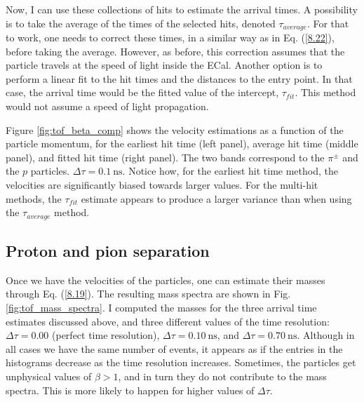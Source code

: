 Now, I can use these collections of hits to estimate the arrival times. A possibility is to take the average of the times of the selected hits, denoted $\tau_{average}$. For that to work, one needs to correct these times, in a similar way as in Eq. (\ref{8.22}), before taking the average. However, as before, this correction assumes that the particle travels at the speed of light inside the ECal. Another option is to perform a linear fit to the hit times and the distances to the entry point. In that case, the arrival time would be the fitted value of the intercept, $\tau_{fit}$. This method would not assume a speed of light propagation.

Figure \ref{fig:tof_beta_comp} shows the velocity estimations as a function of the particle momentum, for the earliest hit time (left panel), average hit time (middle panel), and fitted hit time (right panel). The two bands correspond to the $\pi^{\pm}$ and the $p$ particles. $\Delta \tau = 0.1 ~ \mathrm{ns}$. Notice how, for the earliest hit time method, the velocities are significantly biased towards larger values. For the multi-hit methods, the $\tau_{fit}$ estimate appears to produce a larger variance than when using the $\tau_{average}$ method.

\subsection{Proton and pion separation}

Once we have the velocities of the particles, one can estimate their masses through Eq. (\ref{8.19}). The resulting mass spectra are shown in Fig. \ref{fig:tof_mass_spectra}. I computed the masses for the three arrival time estimates discussed above, and three different values of the time resolution: $\Delta \tau = 0.00$ (perfect time resolution), $\Delta \tau = 0.10 ~ \mathrm{ns}$, and $\Delta \tau = 0.70 ~ \mathrm{ns}$. Although in all cases we have the same number of events, it appears as if the entries in the histograms decrease as the time resolution increases. Sometimes, the particles get unphysical values of $\beta > 1$, and in turn they do not contribute to the mass spectra. This is more likely to happen for higher values of $\Delta \tau$.

